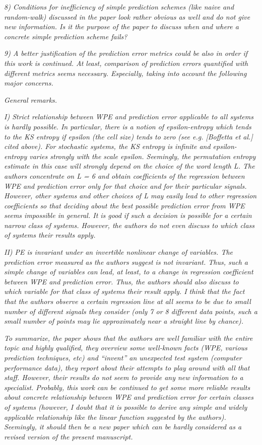 \documentclass[12pt]{article}
\begin{document}
\emph{8) Conditions for inefficiency of simple prediction schemes (like naive
and random-walk) discussed in the paper look rather obvious as well and do not
give new information. Is it the purpose of the paper to discuss when and where a
concrete simple prediction scheme fails?}

\emph{9) A better justification of the prediction error metrics could be also in
order if this work is continued. At least, comparison of prediction errors
quantified with different metrics seems necessary. Especially, taking into
account the following major concerns.}

\noindent\emph{General remarks.}

\emph{I) Strict relationship between WPE and prediction error applicable to all
systems is hardly possible. In particular, there is a notion of epsilon-entropy
which tends to the KS entropy if epsilon (the cell size) tends to zero (see e.g.
[Boffetta et al.] cited above). For stochastic systems, the KS entropy is
infinite and epsilon-entropy varies strongly with the scale epsilon. Seemingly,
the permutation entropy estimate in this case will strongly depend on the choice
of the word length L. The authors concentrate on L = 6 and obtain coefficients
of the regression between WPE and prediction error only for that choice and for
their particular signals. However, other systems and other choices of L may
easily lead to other regression coefficients so that deciding about the best
possible prediction error from WPE seems impossible in general. It is good if
such a decision is possible for a certain narrow class of systems. However, the
authors do not even discuss to which class of systems their results apply.}

\emph{II) PE is invariant under an invertible nonlinear change of variables. The
prediction error measured as the authors suggest is not invariant. Thus, such a
simple change of variables can lead, at least, to a change in regression
coefficient between WPE and prediction error. Thus, the authors should also
discuss to which variable for that class of systems their result apply. I think
that the fact that the authors observe a certain regression line at all seems to
be due to small number of different signals they consider (only 7 or 8 different
data points, such a small number of points may lie approximately near a straight
line by chance).}

\emph{To summarize, the paper shows that the authors are well familiar with the
entire topic and highly qualified, they overview some well-known facts (WPE,
various prediction techniques, etc) and ``invent'' an unexpected test system
(computer performance data), they report about their attempts to play around
with all that staff. However, their results do not seem to provide any new
information to a specialist. Probably, this work can be continued to get some
more reliable results about concrete relationship between WPE and prediction
error for certain classes of systems (however, I doubt that it is possible to
derive any simple and widely applicable relationship like the linear function
suggested by the authors). Seemingly, it should then be a new paper which can be
hardly considered as a revised version of the present manuscript.}
\end{document}
